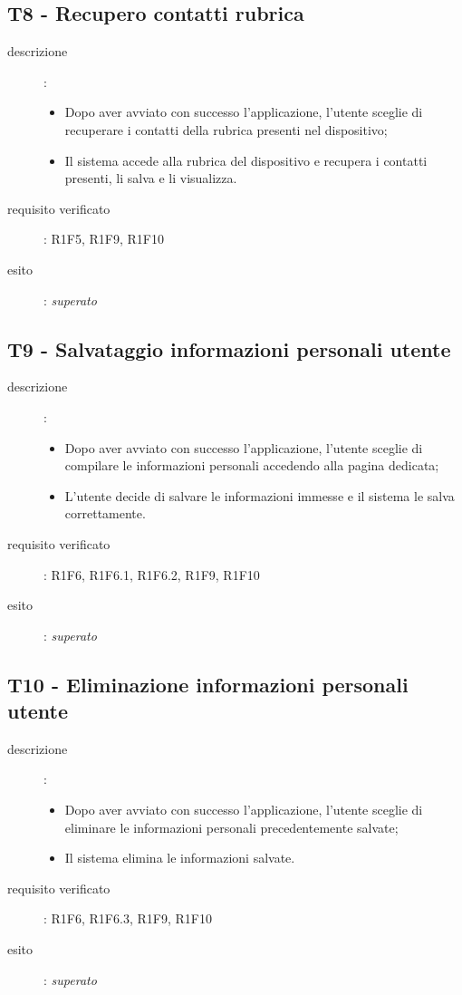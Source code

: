 \subsection{T8 - Recupero contatti rubrica}
\begin{description}
\item[descrizione]: \hfill
	\begin{itemize}
	\item Dopo aver avviato con successo l'applicazione, l'utente sceglie di recuperare i contatti della rubrica presenti nel dispositivo;
	\item Il sistema accede alla rubrica del dispositivo e recupera i contatti presenti, li salva e li visualizza.
	\end{itemize}
\item[requisito verificato]: R1F5, R1F9, R1F10
\item[esito]: \emph{superato}
\end{description}

\subsection{T9 - Salvataggio informazioni personali utente}
\begin{description}
\item[descrizione]: \hfill
	\begin{itemize}
	\item Dopo aver avviato con successo l'applicazione, l'utente sceglie di compilare le informazioni personali accedendo alla pagina dedicata;
	\item L'utente decide di salvare le informazioni immesse e il sistema le salva correttamente.
	\end{itemize}
\item[requisito verificato]: R1F6, R1F6.1, R1F6.2, R1F9, R1F10
\item[esito]: \emph{superato}
\end{description}

\subsection{T10 - Eliminazione informazioni personali utente}
\begin{description}
\item[descrizione]: \hfill
	\begin{itemize}
	\item Dopo aver avviato con successo l'applicazione, l'utente sceglie di eliminare le informazioni personali precedentemente salvate;
	\item Il sistema elimina le informazioni salvate.
	\end{itemize}
\item[requisito verificato]: R1F6, R1F6.3, R1F9, R1F10
\item[esito]: \emph{superato}
\end{description}

